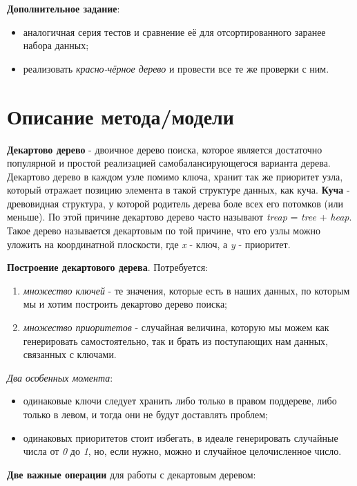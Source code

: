 \documentclass[12pt, a4paper]{report}
\begin{document}
	\par
	\textbf{Дополнительное задание}:
	\begin{itemize}
		\item аналогичная серия тестов и сравнение её для отсортированного заранее набора данных;
		\item реализовать \textit{красно-чёрное дерево} и провести все те же проверки с ним.
	\end{itemize}
	
	\newpage

	\section*{Описание метода/модели}
	\large
	\textbf{Декартово дерево} - двоичное дерево поиска, которое является достаточно популярной и простой реализацией самобалансирующегося варианта дерева. Декартово дерево в каждом узле помимо ключа, хранит так же приоритет узла, который отражает позицию элемента в такой структуре данных, как куча. \textbf{Куча} - древовидная структура, у которой родитель дерева боле всех его потомков (или меньше). По этой причине декартово дерево часто называют \textit{treap} = \textit{tree} + \textit{heap}. Такое дерево называется декартовым по той причине, что его узлы можно уложить на координатной плоскости, где \textit{x} - ключ, а \textit{y} - приоритет. \par
	\textbf{Построение декартового дерева}. Потребуется:
	\begin{enumerate}
		\item \textit{множество ключей} - те значения, которые есть в наших данных, по которым мы и хотим построить декартово дерево поиска;
		\item \textit{множество приоритетов} - случайная величина, которую мы можем как генерировать самостоятельно, так и брать из поступающих нам данных, связанных с ключами.
	\end{enumerate}
	\par
	\textit{Два особенных момента}:
	\begin{itemize}
		\item одинаковые ключи следует хранить либо только в правом поддереве, либо только в левом, и тогда они не будут доставлять проблем;
		\item одинаковых приоритетов стоит избегать, в идеале генерировать случайные числа от \textit{0} до \textit{1}, но, если нужно, можно и случайное целочисленное число.
	\end{itemize}
	\textbf{Две важные операции} для работы с декартовым деревом:
\end{document}

